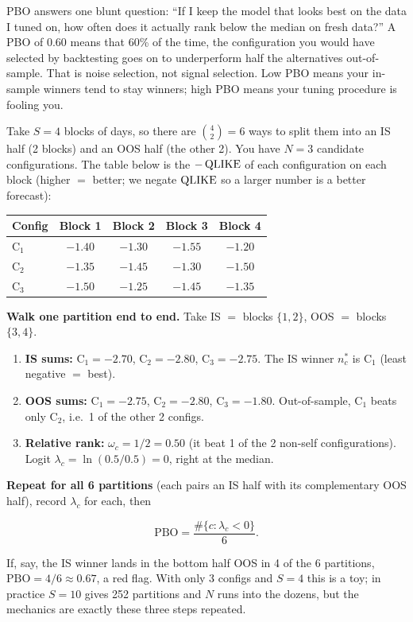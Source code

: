 \begin{intuition}
PBO answers one blunt question: ``If I keep the model that looks best on the data I tuned on, how often does it actually rank below the median on fresh data?''
A PBO of $0.60$ means that 60\% of the time, the configuration you would have selected by backtesting goes on to underperform half the alternatives out-of-sample.
That is noise selection, not signal selection.
Low PBO means your in-sample winners tend to stay winners; high PBO means your tuning procedure is fooling you.
\end{intuition}

\begin{workedexample}[CSCV by Hand: $S=4$, Three Configurations]
Take $S = 4$ blocks of days, so there are $\binom{4}{2} = 6$ ways to split them into an IS half (2 blocks) and an OOS half (the other 2).
You have $N = 3$ candidate configurations.
The table below is the $-\operatorname{QLIKE}$ of each configuration on each block (higher $=$ better; we negate $\operatorname{QLIKE}$ so a larger number is a better forecast):

\medskip
\begin{center}
\begin{tabular}{lcccc}
\toprule
Config & Block 1 & Block 2 & Block 3 & Block 4 \\
\midrule
$\text{C}_1$ & $-1.40$ & $-1.30$ & $-1.55$ & $-1.20$ \\
$\text{C}_2$ & $-1.35$ & $-1.45$ & $-1.30$ & $-1.50$ \\
$\text{C}_3$ & $-1.50$ & $-1.25$ & $-1.45$ & $-1.35$ \\
\bottomrule
\end{tabular}
\end{center}
\medskip

\textbf{Walk one partition end to end.}
Take IS $=$ blocks $\{1,2\}$, OOS $=$ blocks $\{3,4\}$.
\begin{enumerate}[nosep]
  \item \textbf{IS sums:} $\text{C}_1 = -2.70$, $\text{C}_2 = -2.80$, $\text{C}_3 = -2.75$. The IS winner $n^*_c$ is $\text{C}_1$ (least negative $=$ best).
  \item \textbf{OOS sums:} $\text{C}_1 = -2.75$, $\text{C}_2 = -2.80$, $\text{C}_3 = -1.80$. Out-of-sample, $\text{C}_1$ beats only $\text{C}_2$, i.e.\ 1 of the other 2 configs.
  \item \textbf{Relative rank:} $\omega_c = 1/2 = 0.50$ (it beat 1 of the 2 non-self configurations). Logit $\lambda_c = \ln(0.5/0.5) = 0$, right at the median.
\end{enumerate}

\textbf{Repeat for all 6 partitions} (each pairs an IS half with its complementary OOS half), record $\lambda_c$ for each, then

\[
\text{PBO} = \frac{\#\{c : \lambda_c < 0\}}{6}.
\]

If, say, the IS winner lands in the bottom half OOS in 4 of the 6 partitions, $\text{PBO} = 4/6 \approx 0.67$, a red flag.
With only 3 configs and $S=4$ this is a toy; in practice $S = 10$ gives 252 partitions and $N$ runs into the dozens, but the mechanics are exactly these three steps repeated.
\end{workedexample}

